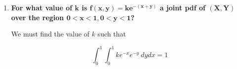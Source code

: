 \documentclass[10pt, oneside]{article}
\begin{document}
\begin{enumerate}[label=6.\arabic*]
\begin{enumerate}
	\[
	\begin{aligned}
	P(X = 0) &= \boxed{\frac{1}{221}} \\
	P(X = 1) &= \boxed{\frac{4}{663}} \\
	P(X = 2) &= \boxed{\frac{1}{221}} \\
	\end{aligned}
	\qquad
	\begin{aligned}
	P(Y = 0) &= \boxed{\frac{1}{221}} \\
	P(Y = 1) &= \boxed{\frac{4}{663}} \\
	P(Y = 2) &= \boxed{\frac{1}{221}}
	\end{aligned} \]
	
	\item  \begin{tcolorbox}[
	  colback=Cerulean!5!white,
	  colframe=Cerulean!75!black]
	\textbf{Obtain the conditional distribution of $\bm{X}$ (given $\bm{Y}$) and of $\bm{Y}$ (given $\bm{X}$).}
	\end{tcolorbox}
	
	\[
	\begin{aligned}
	P(X = 0 | Y = 2) &= \frac{P(X = 0, Y = 2)}{P(Y = 2)} = \boxed{1} \\
	P(X = 1 | Y = 1) &= \frac{P(X = 1, Y = 1)}{P(Y = 1)} = \boxed{1} \\
	P(X = 2 | Y = 0) &= \frac{P(X = 2, Y = 0)}{P(Y = 2)} = \boxed{1} \\
	\end{aligned}
	\qquad
	\begin{aligned}
	P(Y = 0 | X = 2) &= \frac{P(Y = 0, X = 2)}{P(X = 2)} = \boxed{1} \\
	P(Y = 1 | X = 1) &= \frac{P(Y = 1, X = 1)}{P(X = 1)} = \boxed{1} \\
	P(Y = 2 | X = 0) &= \frac{P(Y = 2, X = 0)}{P(X = 0)} = \boxed{1}
	\end{aligned} \]
	
	\end{enumerate}

\item  \begin{tcolorbox}[
  colback=Cerulean!5!white,
  colframe=Cerulean!75!black]
\textbf{For what value of $\bm{k}$ is $\bm{f(x,y) = ke^{-(x+y)}}$ a joint pdf of $\bm{(X,Y)}$ over the region $\bm{0 < x < 1, 0 < y < 1}$?}
\end{tcolorbox}

We must find the value of $k$ such that

\[ \int^1_0 \int^1_0 ke^{-x} e^{-y} \ dy dx = 1 \]


\end{enumerate}
\end{document}
